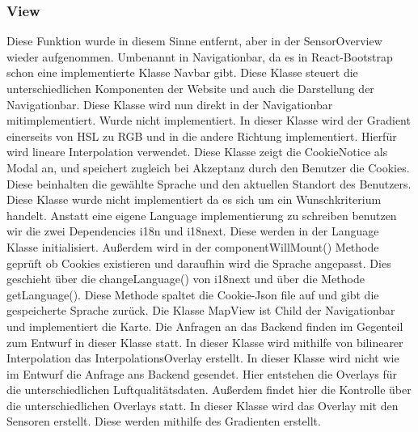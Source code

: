 \subsubsection{View}
    Diese Funktion wurde in diesem Sinne entfernt, aber in der SensorOverview wieder aufgenommen.
    Umbenannt in Navigationbar, da es in React-Bootstrap schon eine implementierte Klasse Navbar gibt.
    Diese Klasse steuert die unterschiedlichen Komponenten der Website und auch die Darstellung der Navigationbar.
    \removedClass
    Diese Klasse wird nun direkt in der Navigationbar mitimplementiert.
    \removedClass
{}
    Wurde nicht implementiert. 
    In dieser Klasse wird der Gradient einerseits von HSL zu RGB und in die andere Richtung implementiert. Hierfür wird lineare Interpolation verwendet.
    Diese Klasse zeigt die CookieNotice als Modal an, und speichert zugleich bei Akzeptanz durch den Benutzer die Cookies.
    Diese beinhalten die gewählte Sprache und den aktuellen Standort des Benutzers.
    Diese Klasse wurde nicht implementiert da es sich um ein Wunschkriterium handelt.
    Anstatt eine eigene Language implementierung zu schreiben benutzen wir die zwei Dependencies i18n und i18next.
    Diese werden in der Language Klasse initialisiert. 
    Außerdem wird in der componentWillMount() Methode geprüft ob Cookies existieren und daraufhin wird die Sprache angepasst. Dies geschieht über die changeLanguage() von i18next und über die Methode getLanguage().
    Diese Methode spaltet die Cookie-Json file auf und gibt die gespeicherte Sprache zurück.
    Die Klasse MapView ist Child der Navigationbar und implementiert die Karte. Die Anfragen an das Backend finden im Gegenteil zum Entwurf in dieser Klasse statt. 
    \removedClass
{}
    In dieser Klasse wird mithilfe von bilinearer Interpolation das InterpolationsOverlay erstellt.
    In dieser Klasse wird nicht wie im Entwurf die Anfrage ans Backend gesendet. Hier entstehen die Overlays für die unterschiedlichen Luftqualitätsdaten.
    Außerdem findet hier die Kontrolle über die unterschiedlichen Overlays statt.
    \removedClass
{}
    In dieser Klasse wird das Overlay mit den Sensoren erstellt. Diese werden mithilfe des Gradienten erstellt.

